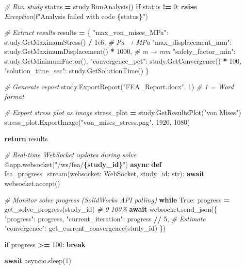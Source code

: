 \documentclass[
]{article}
\newenvironment{Shaded}{\begin{snugshade}}{\end{snugshade}}
\newcommand{\AttributeTok}[1]{\textcolor[rgb]{0.13,0.29,0.53}{#1}}
\newcommand{\BuiltInTok}[1]{#1}
\newcommand{\CommentTok}[1]{\textcolor[rgb]{0.56,0.35,0.01}{\textit{#1}}}
\newcommand{\ControlFlowTok}[1]{\textcolor[rgb]{0.13,0.29,0.53}{\textbf{#1}}}
\newcommand{\DecValTok}[1]{\textcolor[rgb]{0.00,0.00,0.81}{#1}}
\newcommand{\FloatTok}[1]{\textcolor[rgb]{0.00,0.00,0.81}{#1}}
\newcommand{\KeywordTok}[1]{\textcolor[rgb]{0.13,0.29,0.53}{\textbf{#1}}}
\newcommand{\NormalTok}[1]{#1}
\newcommand{\OperatorTok}[1]{\textcolor[rgb]{0.81,0.36,0.00}{\textbf{#1}}}
\newcommand{\PreprocessorTok}[1]{\textcolor[rgb]{0.56,0.35,0.01}{\textit{#1}}}
\newcommand{\SpecialCharTok}[1]{\textcolor[rgb]{0.81,0.36,0.00}{\textbf{#1}}}
\newcommand{\SpecialStringTok}[1]{\textcolor[rgb]{0.31,0.60,0.02}{#1}}
\newcommand{\StringTok}[1]{\textcolor[rgb]{0.31,0.60,0.02}{#1}}
\newcommand{\VariableTok}[1]{\textcolor[rgb]{0.00,0.00,0.00}{#1}}
\begin{document}
\begin{Shaded}
\begin{Highlighting}[]
    \CommentTok{\# Run study}
\NormalTok{    status }\OperatorTok{=}\NormalTok{ study.RunAnalysis()}
    \ControlFlowTok{if}\NormalTok{ status }\OperatorTok{!=} \DecValTok{0}\NormalTok{:}
        \ControlFlowTok{raise} \PreprocessorTok{Exception}\NormalTok{(}\SpecialStringTok{f"Analysis failed with code }\SpecialCharTok{\{}\NormalTok{status}\SpecialCharTok{\}}\SpecialStringTok{"}\NormalTok{)}

    \CommentTok{\# Extract results}
\NormalTok{    results }\OperatorTok{=}\NormalTok{ \{}
        \StringTok{"max\_von\_mises\_MPa"}\NormalTok{: study.GetMaximumStress() }\OperatorTok{/} \FloatTok{1e6}\NormalTok{,  }\CommentTok{\# Pa → MPa}
        \StringTok{"max\_displacement\_mm"}\NormalTok{: study.GetMaximumDisplacement() }\OperatorTok{*} \DecValTok{1000}\NormalTok{,  }\CommentTok{\# m → mm}
        \StringTok{"safety\_factor\_min"}\NormalTok{: study.GetMinimumFactor(),}
        \StringTok{"convergence\_pct"}\NormalTok{: study.GetConvergence() }\OperatorTok{*} \DecValTok{100}\NormalTok{,}
        \StringTok{"solution\_time\_sec"}\NormalTok{: study.GetSolutionTime()}
\NormalTok{    \}}

    \CommentTok{\# Generate report}
\NormalTok{    study.ExportReport(}\StringTok{"FEA\_Report.docx"}\NormalTok{, }\DecValTok{1}\NormalTok{)  }\CommentTok{\# 1 = Word format}

    \CommentTok{\# Export stress plot as image}
\NormalTok{    stress\_plot }\OperatorTok{=}\NormalTok{ study.GetResultsPlot(}\StringTok{"von Mises"}\NormalTok{)}
\NormalTok{    stress\_plot.ExportImage(}\StringTok{"von\_mises\_stress.png"}\NormalTok{, }\DecValTok{1920}\NormalTok{, }\DecValTok{1080}\NormalTok{)}

    \ControlFlowTok{return}\NormalTok{ results}

\CommentTok{\# Real{-}time WebSocket updates during solve}
\AttributeTok{@app.websocket}\NormalTok{(}\StringTok{"/ws/fea/}\SpecialCharTok{\{study\_id\}}\StringTok{"}\NormalTok{)}
\ControlFlowTok{async} \KeywordTok{def}\NormalTok{ fea\_progress\_stream(websocket: WebSocket, study\_id: }\BuiltInTok{str}\NormalTok{):}
    \ControlFlowTok{await}\NormalTok{ websocket.accept()}

    \CommentTok{\# Monitor solve progress (SolidWorks API polling)}
    \ControlFlowTok{while} \VariableTok{True}\NormalTok{:}
\NormalTok{        progress }\OperatorTok{=}\NormalTok{ get\_solve\_progress(study\_id)  }\CommentTok{\# 0{-}100\%}
        \ControlFlowTok{await}\NormalTok{ websocket.send\_json(\{}
            \StringTok{"progress"}\NormalTok{: progress,}
            \StringTok{"current\_iteration"}\NormalTok{: progress }\OperatorTok{//} \DecValTok{5}\NormalTok{,  }\CommentTok{\# Estimate}
            \StringTok{"convergence"}\NormalTok{: get\_current\_convergence(study\_id)}
\NormalTok{        \})}

        \ControlFlowTok{if}\NormalTok{ progress }\OperatorTok{\textgreater{}=} \DecValTok{100}\NormalTok{:}
            \ControlFlowTok{break}

        \ControlFlowTok{await}\NormalTok{ asyncio.sleep(}\DecValTok{1}\NormalTok{)}
\end{Highlighting}
\end{Shaded}
\end{document}
